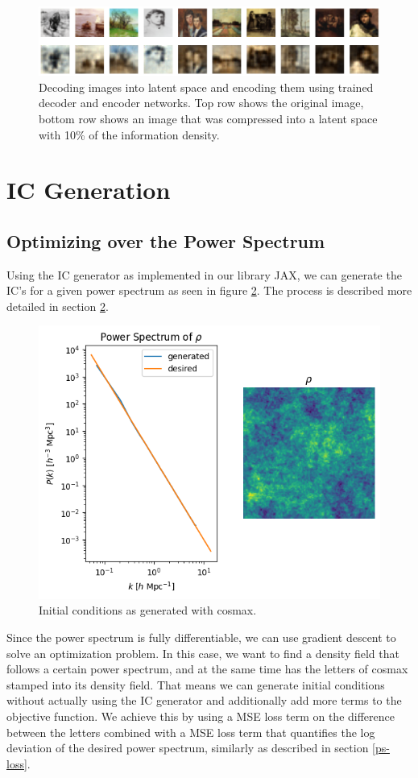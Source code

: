 \documentclass{article}
\begin{document}
{\begin{appendices}
\begin{figure}[h]
    \centering
    \includegraphics[width=0.75\linewidth]{img/reconstruction.png}
    \caption{Decoding images into latent space and encoding them using trained decoder and encoder networks. Top row shows the original image, bottom row shows an image that was compressed into a latent space with 10\% of the information density.}
    \label{fig:ed}
\end{figure}


\newpage
\section{IC Generation}

\subsection{Optimizing over the Power Spectrum}
\label{optim}

Using the IC generator as implemented in our library JAX, we can generate the IC's for a given power spectrum as seen in figure \ref{fig:cosmax-ic}. The process is described more detailed in section \ref{fig:cosmax-ic}.

\begin{figure}[h]
    \centering
    \includegraphics[width=0.5\linewidth]{img/ic_gen.png}
    \caption{Initial conditions as generated with cosmax.}
    \label{fig:cosmax-ic}
\end{figure}

Since the power spectrum is fully differentiable, we can use gradient descent to solve an optimization problem. In this case, we want to find a density field that follows a certain power spectrum, and at the same time has the letters of cosmax stamped into its density field. That means we can generate initial conditions without actually using the IC generator and additionally add more terms to the objective function. We achieve this by using a MSE loss term on the difference between the letters combined with a MSE loss term that quantifies the log deviation of the desired power spectrum, similarly as described in section \ref{ps-loss}.


\end{appendices}}
\end{document}
